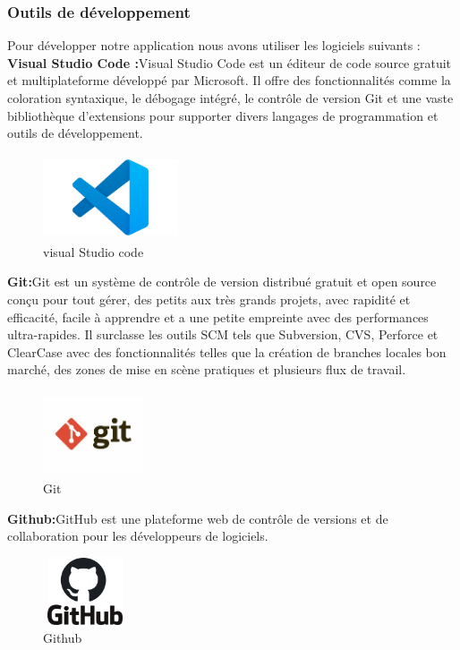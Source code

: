 \documentclass[edit,12pt,a4paper,ChapStyle,oneside,doubleinterligne]{report}
\begin{document}
\subsubsection{Outils de développement }
Pour développer notre application nous avons utiliser les logiciels suivants :
\newline\textbf {Visual Studio Code :}Visual Studio Code est un éditeur de code source gratuit et multiplateforme développé par Microsoft. Il offre des fonctionnalités comme la coloration syntaxique, le débogage intégré, le contrôle de version Git et une vaste bibliothèque d'extensions pour supporter divers langages de programmation et outils de développement.\cite{vscode}
\begin{figure}[H]\label{fig:vscode}
    \centering
    \includegraphics[width=4cm , height = 2.5cm , angle=360]{images/vscode.png}
    \caption{visual Studio code}
    \end{figure}
\textbf {Git:}Git est un système de contrôle de version distribué gratuit et open source conçu pour tout gérer, des petits aux très grands projets, avec rapidité et efficacité, facile à apprendre et a une petite empreinte avec des performances ultra-rapides. Il surclasse les outils SCM tels que Subversion, CVS, Perforce et ClearCase avec des fonctionnalités telles que la création de branches locales bon marché, des zones de mise en scène pratiques et plusieurs flux de travail. \cite{git}
\begin{figure}[H]
    \centering
    \includegraphics[width=3cm , height = 2.5cm , angle=360]{images/git.jpg}
    \caption{Git}
    \label{fig:git}
\end{figure}
  \textbf {Github:}GitHub est une plateforme web de contrôle de versions et de collaboration pour les développeurs de logiciels. \cite{github}
  \begin{figure} [H]
    \centering
    \includegraphics[width=2.5cm , height = 2cm , angle=360]{images/github.png}
    \caption{Github}
    \label{fig:github}
\end{figure}
\end{document}

